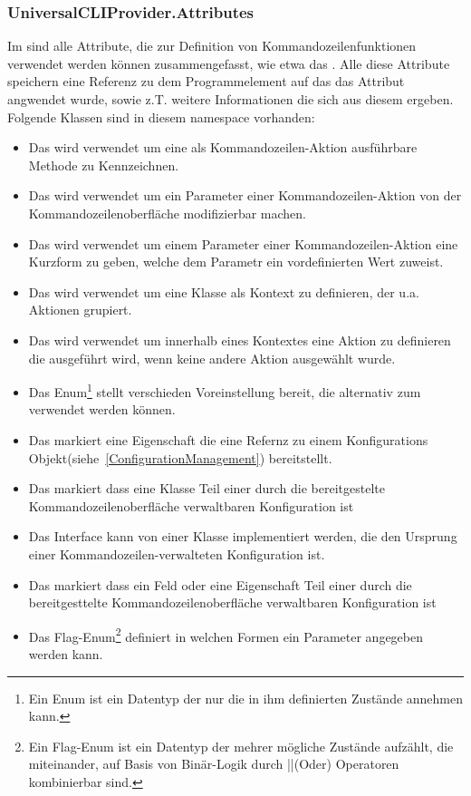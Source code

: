  \subsubsection{UniversalCLIProvider.Attributes}
 Im  sind alle Attribute, die zur Definition von Kommandozeilenfunktionen verwendet werden können zusammengefasst, wie etwa das .
 Alle diese Attribute speichern eine Referenz zu dem Programmelement auf das das Attribut angwendet wurde, sowie z.T. weitere Informationen die sich aus diesem ergeben.
 Folgende Klassen sind in diesem namespace vorhanden:
 \begin{itemize}
\item Das  wird verwendet um eine als Kommandozeilen-Aktion ausführbare Methode zu Kennzeichnen.
\item Das  wird verwendet um ein Parameter einer Kommandozeilen-Aktion von der Kommandozeilenoberfläche modifizierbar machen.
\item Das  wird verwendet um einem Parameter einer Kommandozeilen-Aktion eine Kurzform zu geben, welche dem Parametr ein vordefinierten Wert zuweist.
\item Das  wird verwendet um eine Klasse als Kontext zu definieren, der u.a. Aktionen grupiert.
\item Das  wird verwendet um innerhalb eines Kontextes eine Aktion zu definieren die ausgeführt wird, wenn keine andere Aktion ausgewählt wurde.
\item Das Enum\footnote{Ein Enum ist ein Datentyp der nur die in ihm definierten Zustände annehmen kann.} 
stellt verschieden Voreinstellung bereit, die alternativ zum  verwendet werden können.
\item Das  markiert eine Eigenschaft die eine Refernz zu einem Konfigurations Objekt(siehe~\ref{ConfigurationManagement}) bereitstellt.
\item Das  markiert dass eine Klasse Teil einer durch die bereitgestelte Kommandozeilenoberfläche verwaltbaren Konfiguration ist
\item Das Interface  kann von einer Klasse implementiert werden, die den Ursprung einer Kommandozeilen-verwalteten Konfiguration ist.
\item Das markiert dass ein Feld oder eine Eigenschaft Teil einer durch die bereitgesttelte Kommandozeilenoberfläche verwaltbaren Konfiguration ist
\item Das Flag-Enum\footnote{Ein Flag-Enum ist ein Datentyp der mehrer mögliche Zustände aufzählt, die miteinander, auf Basis von Binär-Logik durch ||(Oder) Operatoren kombinierbar sind.}
 definiert in welchen Formen ein Parameter angegeben werden kann.
 \end{itemize}

